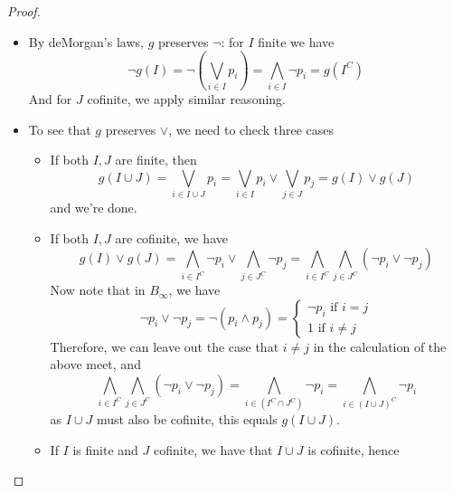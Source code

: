\begin{proof}
  \begin{itemize}
    \item 
      By deMorgan's laws, $g$ preserves $\neg$:
      for $I$ finite we have
      \begin{equation}
      \neg g(I) = \neg (\bigvee_{i\in I} p_i) = \bigwedge_{i\in I} \neg p_i = g(I^C)
      \end{equation}
      And for $J$ cofinite, we apply similar reasoning. 
    \item To see that $g$ preserves $\vee$, we need to check three cases
      \begin{itemize}
        \item If both $I,J$ are finite, then 
        \begin{equation} 
          g(I \cup J) = \bigvee_{i\in I \cup J} p_i= \bigvee_{i\in I} p_i \vee \bigvee_{j\in J} p_j 
          = g(I) \vee g(J)
        \end{equation}
        and we're done. 
      \item If both $I,J$ are cofinite, we have
        \begin{equation}
          g(I) \vee g(J) = 
          \bigwedge_{i \in I^C} \neg p_i \vee 
          \bigwedge_{j \in J^C} \neg p_j 
          = 
          \bigwedge_{i\in I^C} 
          \bigwedge_{j \in J^C}(\neg p_i \vee  \neg p_j) 
        \end{equation}
        Now note that in $B_\infty$, we have 
        \begin{equation}
          \neg p_i \vee \neg p_j = \neg ( p_i \wedge p_j) = 
          \begin{cases}
            \neg p_i \text{ if } i = j\\
            1 \text{ if } i \neq j  
          \end{cases}
        \end{equation}
        Therefore, we can leave out the case that $i\neq j$ in the calculation of the above meet, and
        \begin{equation}
          \bigwedge_{i\in I^C} 
          \bigwedge_{j \in J^C}(\neg p_i \vee  \neg p_j)  
          = 
          \bigwedge_{i \in (I^C \cap J^C)} \neg p_i
          = 
          \bigwedge_{i \in (I \cup J)^C} \neg p_i 
        \end{equation}
        as $I\cup J$ must also be cofinite, this equals 
          $ g( I \cup J)$. 
        \item 
          If $I$ is finite and $J$ cofinite, we have 
          that $I\cup J$ is cofinite, hence 
          \begin{equation}

\end{equation}
\end{itemize}
\end{itemize}
\end{proof}
